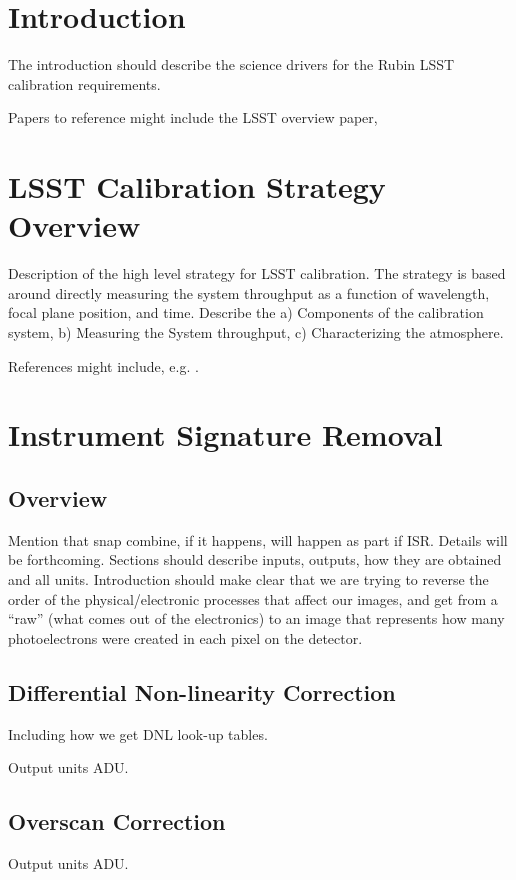\section{Introduction}

The introduction should describe the science drivers for  the Rubin LSST calibration requirements.

Papers to reference might include  the LSST overview paper, \cite{2008arXiv0805.2366I} 

\section{LSST Calibration Strategy Overview}

Description of the high level strategy for LSST calibration. 
The strategy is based around directly measuring the system throughput as a function of wavelength, focal plane position, and time. 
Describe the a) Components of the calibration system, b) Measuring the System throughput, c) Characterizing the atmosphere.

References might include, e.g.  \cite{2017PASP..129k4502B}.

\section{Instrument Signature Removal}

\subsection{Overview}
Mention that snap combine, if it happens, will happen as part if ISR. 
Details will be forthcoming. 
Sections should describe inputs, outputs, how they are obtained and all units.
Introduction should make clear that we are trying to reverse the order of the physical/electronic processes that affect our images, and get from a “raw” (what comes out of the electronics) to an image that represents how many photoelectrons were created in each pixel on the detector.

 
\subsection{Differential Non-linearity Correction}
Including how we get DNL look-up tables.

Output units ADU.


\subsection{Overscan Correction}
Output units ADU.

